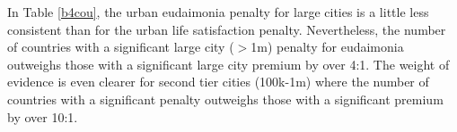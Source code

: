 \documentclass[10pt, letterpaper]{article}
\begin{document}
\begin{spacing}{1.4}
In Table \ref{b4cou}, the urban eudaimonia penalty for large cities is a little less consistent than for the urban life satisfaction penalty. Nevertheless, the number of countries with a significant large city ($>$1m) penalty for
eudaimonia outweighs those with a significant large city premium by over 4:1. The weight of evidence is even
clearer for second tier cities (100k-1m) where the number of countries with a significant penalty outweighs those
with a significant premium by over 10:1.




\end{spacing}
\end{document}
